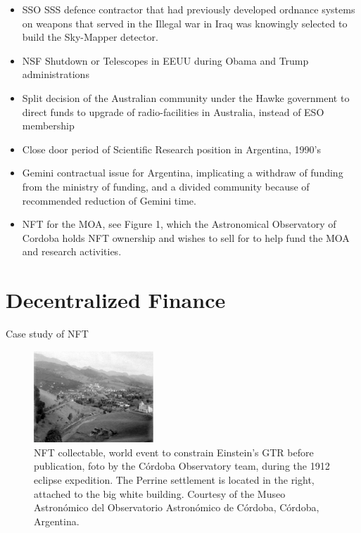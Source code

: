 \documentclass[final,5p,times,twocolumn,authoryear]{elsarticle}
\begin{document}
\begin{itemize}
    \item{SSO SSS defence contractor that had previously developed ordnance systems on weapons that served in the Illegal war in Iraq was knowingly selected to build the Sky-Mapper detector. } 
    \item{NSF Shutdown or Telescopes in EEUU during Obama and Trump administrations}
    \item{Split decision of the Australian community under the Hawke government to direct funds to upgrade of radio-facilities in Australia, instead of ESO membership}
    \item{Close door period of Scientific Research position in Argentina, 1990's}
    \item{Gemini contractual issue for Argentina, implicating a withdraw of funding from the ministry of funding, and a divided community because of recommended reduction of Gemini time.}
    \item{NFT for the MOA}, see Figure 1, which the Astronomical Observatory of Cordoba holds NFT ownership and wishes to sell for to help fund the MOA and research activities. 

\end{itemize}


\section{Decentralized Finance} 

Case study of NFT
\begin{figure}[ht!]
    \centering
    \label{fig:my_label}
  \caption{NFT collectable, world event to constrain Einstein's GTR before publication, foto by the C\'ordoba Observatory team,
during the 1912 eclipse expedition. The Perrine settlement is located in the right, attached to the big white building. Courtesy of the Museo Astron\'omico del Observatorio Astron\'omico de C\'ordoba, C\'ordoba, Argentina.}
  \includegraphics[width=0.4\textwidth]{figs/p1912.eps}
\end{figure}
\end{document}
